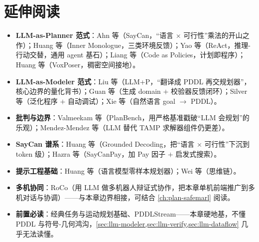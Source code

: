 \section*{延伸阅读}
\label{sec:llm-further}

\begin{itemize}
  \item \textbf{LLM-as-Planner 范式}：Ahn 等\cite{ahn2022saycan}（SayCan，“语言 $\times$ 可行性”乘法的开山之作）；Huang 等\cite{huang2022innermonologue}（Inner Monologue，三类环境反馈）；Yao 等\cite{yao2023react}（ReAct，推理-行动交替，通用 agent 基石）；Liang 等\cite{liang2023codeaspolicies}（Code as Policies，计划即程序）；Huang 等\cite{huang2023voxposer}（VoxPoser，稠密空间接地）。
  \item \textbf{LLM-as-Modeler 范式}：Liu 等\cite{liu2023llmp}（LLM+P，“翻译成 PDDL 再交规划器”，核心边界的量化背书）；Guan 等\cite{guan2023worldmodel}（生成 domain $+$ 校验器反馈闭环）；Silver 等\cite{silver2024generalized}（泛化程序 $+$ 自动调试）；Xie 等\cite{xie2023translating}（自然语言 goal $\to$ PDDL）。
  \item \textbf{批判与边界}：Valmeekam 等\cite{valmeekam2023planbench}（PlanBench，用严格基准戳破“LLM 会规划”的乐观）；Mendez-Mendez 等\cite{mendezmendez2025llmtamp}（LLM 替代 TAMP 求解器组件仍更差）。
  \item \textbf{SayCan 谱系}：Huang 等\cite{huang2023grounded}（Grounded Decoding，把“语言 $\times$ 可行性”下沉到 token 级）；Hazra 等\cite{hazra2024saycanpay}（SayCanPay，加 Pay 因子 $+$ 启发式搜索）。
  \item \textbf{提示工程基础}：Huang 等\cite{huang2022zeroshot}（语言模型零样本规划器）；Wei 等\cite{wei2022cot}（思维链）。
  \item \textbf{多机协同}：RoCo\cite{mandi2024roco}（用 LLM 做多机器人辩证式协作，把本章单机前端推广到多机对话与协调）——与本章边界相接，可结合 \cref{ch:plan-safemarl} 阅读。
  \item \textbf{前置必读}：经典任务与运动规划基础、PDDLStream——本章硬地基，不懂 PDDL 与符号-几何鸿沟，\cref{sec:llm-modeler,sec:llm-verify,sec:llm-dataflow} 几乎无法读懂。
\end{itemize}
